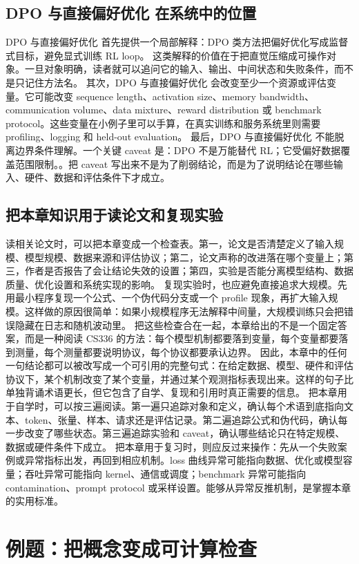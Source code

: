 \documentclass[a4paper]{article}
\begin{document}
\subsection{DPO 与直接偏好优化 在系统中的位置}
DPO 与直接偏好优化 首先提供一个局部解释：DPO 类方法把偏好优化写成监督式目标，避免显式训练 RL loop。 这类解释的价值在于把直觉压缩成可操作对象。一旦对象明确，读者就可以追问它的输入、输出、中间状态和失败条件，而不是只记住方法名。
其次，DPO 与直接偏好优化 会改变至少一个资源或评估变量。它可能改变 sequence length、activation size、memory bandwidth、communication volume、data mixture、reward distribution 或 benchmark protocol。这些变量在小例子里可以手算，在真实训练和服务系统里则需要 profiling、logging 和 held-out evaluation。
最后，DPO 与直接偏好优化 不能脱离边界条件理解。一个关键 caveat 是：DPO 不是万能替代 RL；它受偏好数据覆盖范围限制。。把 caveat 写出来不是为了削弱结论，而是为了说明结论在哪些输入、硬件、数据和评估条件下才成立。
\subsection{把本章知识用于读论文和复现实验}
读相关论文时，可以把本章变成一个检查表。第一，论文是否清楚定义了输入规模、模型规模、数据来源和评估协议；第二，论文声称的改进落在哪个变量上；第三，作者是否报告了会让结论失效的设置；第四，实验是否能分离模型结构、数据质量、优化设置和系统实现的影响。
复现实验时，也应避免直接追求大规模。先用最小程序复现一个公式、一个伪代码分支或一个 profile 现象，再扩大输入规模。这样做的原因很简单：如果小规模程序无法解释中间量，大规模训练只会把错误隐藏在日志和随机波动里。
把这些检查合在一起，本章给出的不是一个固定答案，而是一种阅读 CS336 的方法：每个模型机制都要落到变量，每个变量都要落到测量，每个测量都要说明协议，每个协议都要承认边界。
因此，本章中的任何一句结论都可以被改写成一个可引用的完整句式：在给定数据、模型、硬件和评估协议下，某个机制改变了某个变量，并通过某个观测指标表现出来。这样的句子比单独背诵术语更长，但它包含了自学、复现和引用时真正需要的信息。
把本章用于自学时，可以按三遍阅读。第一遍只追踪对象和定义，确认每个术语到底指向文本、token、张量、样本、请求还是评估记录。第二遍追踪公式和伪代码，确认每一步改变了哪些状态。第三遍追踪实验和 caveat，确认哪些结论只在特定规模、数据或硬件条件下成立。
把本章用于复习时，则应反过来操作：先从一个失败案例或异常指标出发，再回到相应机制。loss 曲线异常可能指向数据、优化或模型容量；吞吐异常可能指向 kernel、通信或调度；benchmark 异常可能指向 contamination、prompt protocol 或采样设置。能够从异常反推机制，是掌握本章的实用标准。
\section{例题：把概念变成可计算检查}
\end{document}
